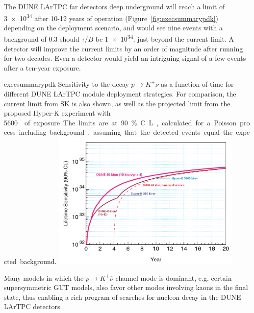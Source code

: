 The DUNE LArTPC far detectors deep underground will reach a limit of
\SI{3e34}{\year} after 10-12 years of operation
(Figure~\ref{fig:execsummarypdk}) depending on the deployment
scenario, and would see nine events with a background of 0.3 should
$\tau/B$ be \SI{1e34}{\year}, just beyond the current limit. A
 detector will improve the current limits by an order of
magnitude after running for two decades. Even a  detector
would yield an intriguing signal of a few events after a ten-year
exposure.


\begin{cdrfigure}{execsummarypdk} {Sensitivity to the
    decay $p\to K^+ \bar{\nu}$ as a function of time for different DUNE 
LArTPC module deployment strategies. 
  For comparison, the current limit from SK is also shown, as well as the projected limit from the proposed Hyper-K experiment with \SI{5600}\ktyr{} of exposure.
  The limits are at 90\% C.L., calculated for
  a Poisson process including background, assuming that the detected events
  equal the expected background.}
\includegraphics[width=0.7\textwidth]{volume-physics/figures/lar4x10.png}
\end{cdrfigure}

Many models in which the $p\to K^+\overline{\nu}$ channel mode is
dominant, e.g. certain supersymmetric GUT models, also favor other
modes involving kaons in the final state, thus enabling a rich program
of searches for nucleon decay in the DUNE LArTPC detectors.


